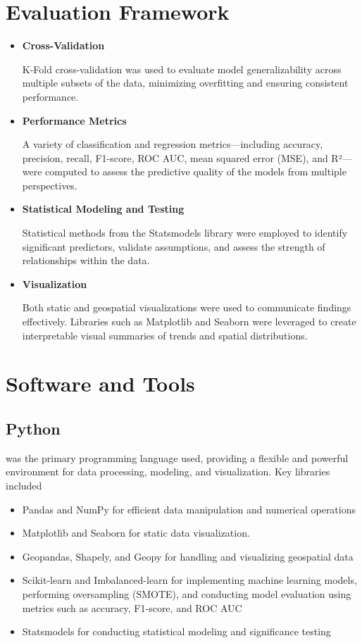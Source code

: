 \documentclass{report}
\begin{document}
	\section{Evaluation Framework}
	
	\begin{itemize}
		\item \textbf{Cross-Validation}
		\par K-Fold cross-validation was used to evaluate model generalizability across multiple subsets of the data, minimizing overfitting and ensuring consistent performance.
		
		\item \textbf{Performance Metrics}
		\par A variety of classification and regression metrics—including accuracy, precision, recall, F1-score, ROC AUC, mean squared error (MSE), and R²—were computed to assess the predictive quality of the models from multiple perspectives.
		
		\item \textbf{Statistical Modeling and Testing}
		\par Statistical methods from the Statsmodels library were employed to identify significant predictors, validate assumptions, and assess the strength of relationships within the data.
		
		\item \textbf{Visualization}
		\par Both static and geospatial visualizations were used to communicate findings effectively. Libraries such as Matplotlib and Seaborn were leveraged to create interpretable visual summaries of trends and spatial distributions.
	\end{itemize}
	
	\section{Software and Tools}
	\subsection{Python}
	\par was the primary programming language used, providing a flexible and powerful environment for data processing, modeling, and visualization. Key libraries included
	\begin{itemize}
		\item Pandas and NumPy for efficient data manipulation and numerical operations
		\item Matplotlib and Seaborn for static data visualization.
		\item Geopandas, Shapely, and Geopy for handling and visualizing geospatial data
		\item Scikit-learn and Imbalanced-learn for implementing machine learning models, performing oversampling (SMOTE), and conducting model evaluation using metrics such as accuracy, F1-score, and ROC AUC
		\item Statsmodels for conducting statistical modeling and significance testing
	\end{itemize}
	
\end{document}
